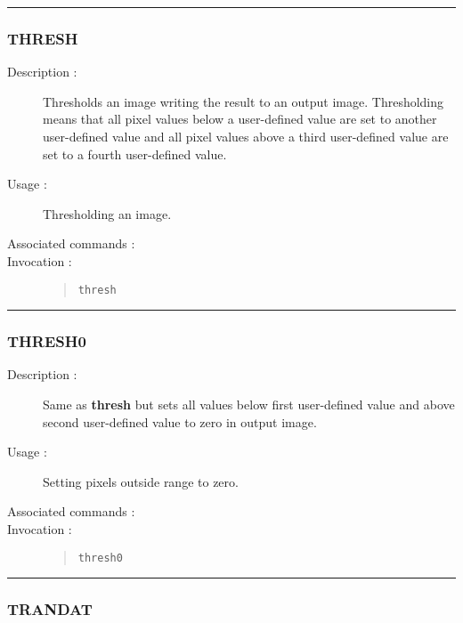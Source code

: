 \hrule
\subsubsection*{\label{THRESH}THRESH}

\begin{description}

\item[Description :] Thresholds an image writing the result to an
output image.  Thresholding means that all pixel values below a
user-defined value are set to another user-defined value and all pixel
values above a third user-defined value are set to a fourth
user-defined value.

\item[Usage :] Thresholding an image.
\item[Associated commands :] {\tt {}}
\item[Invocation :]

\begin{quote}{\tt  thresh }\end{quote}

\end{description}

\hrule
\subsubsection*{\label{THRESH0}THRESH0}

\begin{description}

\item[Description :] Same as {\bf thresh} but sets all values below first
user-defined value and above second user-defined value to zero in
output image.

\item[Usage :] Setting pixels outside range to zero.
\item[Associated commands :] {\tt {}}
\item[Invocation :]

\begin{quote}{\tt  thresh0 }\end{quote}

\end{description}

\hrule
\subsubsection*{\label{TRANDAT}TRANDAT}

